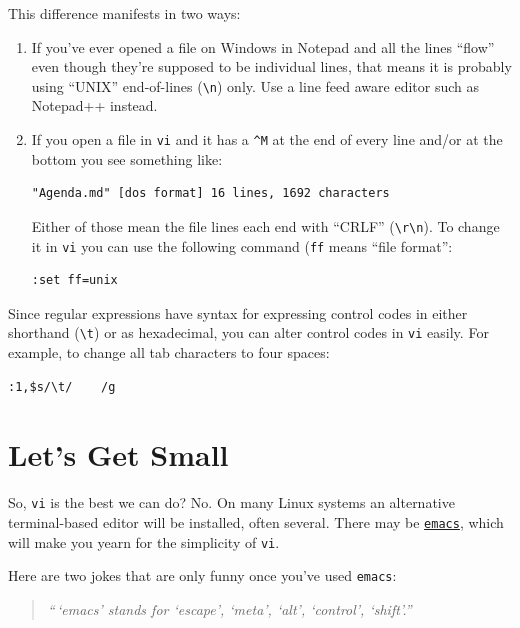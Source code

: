 \documentclass[10pt,]{book}
\numberwithin{figure}{chapter}
\begin{document}
This difference manifests in two ways:

\begin{enumerate}
\def\labelenumi{\arabic{enumi}.}
\item
  If you've ever opened a file on Windows in Notepad and all the lines
  ``flow'' even though they're supposed to be individual lines, that
  means it is probably using ``UNIX'' end-of-lines
  (\texttt{\textbackslash{}n}) only. Use a line feed aware editor such
  as Notepad++ instead.
\item
  If you open a file in \texttt{vi} and it has a \texttt{\^{}M} at the
  end of every line and/or at the bottom you see something like:

\begin{verbatim}
"Agenda.md" [dos format] 16 lines, 1692 characters
\end{verbatim}

  Either of those mean the file lines each end with ``CRLF''
  (\texttt{\textbackslash{}r\textbackslash{}n}). To change it in
  \texttt{vi} you can use the following command (\texttt{ff} means
  ``file format'':

\begin{verbatim}
:set ff=unix
\end{verbatim}
\end{enumerate}

Since regular expressions have syntax for expressing control codes in
either shorthand (\texttt{\textbackslash{}t}) or as hexadecimal, you can
alter control codes in \texttt{vi} easily. For example, to change all
tab characters to four spaces:

\begin{verbatim}
:1,$s/\t/    /g
\end{verbatim}

\section{Let's Get Small}\label{lets-get-small}

So, \texttt{vi} is the best we can do? No. On many Linux systems an
alternative terminal-based editor will be installed, often several.
There may be \href{http://linux.die.net/man/1/emacs}{\texttt{emacs}},
which will make you yearn for the simplicity of \texttt{vi}.

Here are two jokes that are only funny once you've used \texttt{emacs}:

\begin{quote}
\emph{``\,`emacs' stands for `escape', `meta', `alt', `control',
`shift'.''}
\end{quote}
\end{document}
